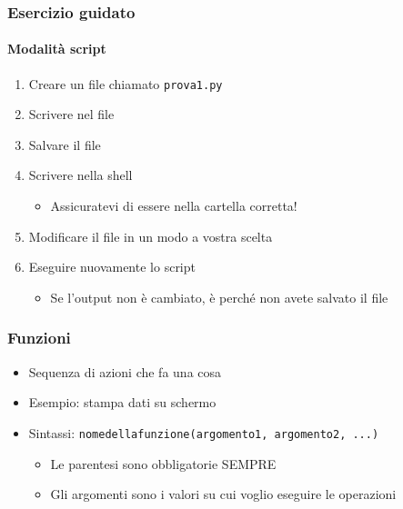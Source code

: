\begin{exerciseframe}
    \frametitle{Esercizio guidato}
    \framesubtitle{Modalità script}

    \begin{enumerate}
        \item Creare un file chiamato \texttt{prova1.py}
        \item Scrivere nel file 
        \item Salvare il file
        \item Scrivere nella shell 
        \begin{itemize}
            \item Assicuratevi di essere nella cartella corretta!
        \end{itemize}

        \pause
        \bigskip
        \item Modificare il file in un modo a vostra scelta
        \item Eseguire nuovamente lo script
        \begin{itemize}
            \item Se l'output non è cambiato, è perché non avete salvato il file
        \end{itemize}
    \end{enumerate}
\end{exerciseframe}


\begin{contentframe}
    \frametitle{Funzioni}

    \begin{itemize}
        \item Sequenza di azioni che fa una cosa

        \bigskip
        \item Esempio:  stampa dati su schermo

        \bigskip
        \item Sintassi: \texttt{nomedellafunzione(argomento1, argomento2, ...)}
        \begin{itemize}
            \item Le parentesi sono obbligatorie SEMPRE
            \item Gli argomenti sono i valori su cui voglio eseguire le operazioni
        \end{itemize}
    \end{itemize}
\end{contentframe}


